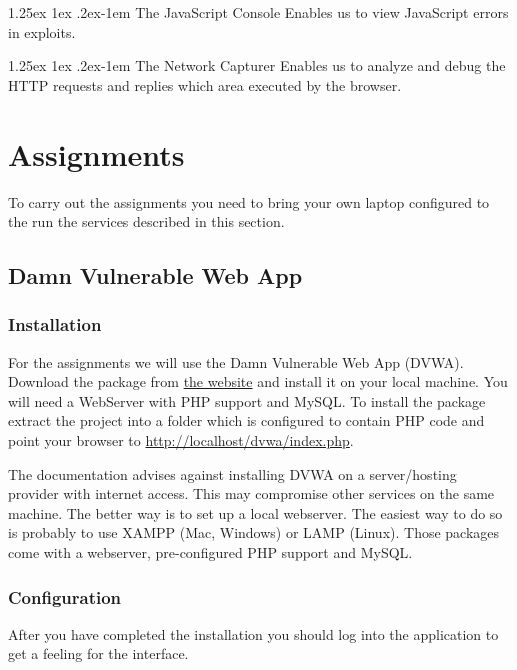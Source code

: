 \documentclass{report}
\makeatletter
\renewcommand{\paragraph}{
  \@startsection{paragraph}{4}
    {\z@}{1.25ex \@plus 1ex \@minus .2ex}{-1em}
      {\normalfont\normalsize\bfseries}
      }
\makeatother
\begin{document}
\paragraph{The JavaScript Console}
Enables us to view JavaScript errors in exploits.

\paragraph{The Network Capturer}
Enables us to analyze and debug the HTTP requests and replies which area
executed by the browser.


\section{Assignments}

To carry out the assignments you need to bring your own laptop configured
to the run the services described in this section.

\subsection{Damn Vulnerable Web App}
\subsubsection{Installation}
For the assignments we will use the Damn Vulnerable Web App (\textsc{DVWA}).
Download the package from \href{http://www.dvwa.co.uk/}{the website} and 
install it on your local machine. You will need a WebServer with PHP support 
and MySQL. To install the package extract the project into a folder which
is configured to contain PHP code and point your browser to 
\href{http://localhost/dvwa/index.php}{http://localhost/dvwa/index.php}.

The documentation advises against installing \textsc{DVWA} on a server/hosting 
provider with internet access. This may compromise other services on the same 
machine.
The better way is to set up a local webserver. The easiest way to do so
is probably to use XAMPP (Mac, Windows) or LAMP (Linux). Those packages
come with a webserver, pre-configured PHP support and MySQL.

\subsubsection{Configuration}
After you have completed the installation you should log into the
application to get a feeling for the interface.
\end{document}
